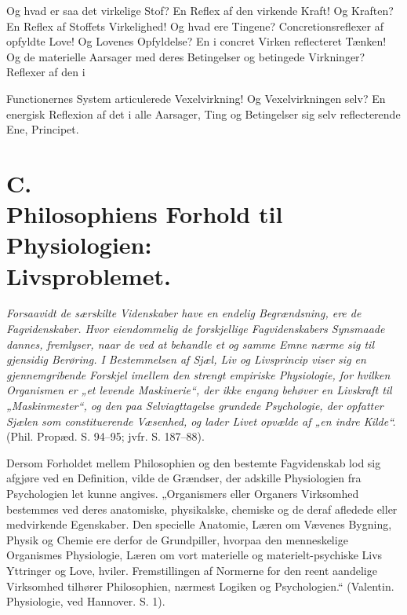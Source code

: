 \documentclass[12pt,a4paper]{book}
\begin{document}
Og hvad er saa det virkelige Stof? En Reflex af
den virkende Kraft! Og Kraften? En Reflex af Stoffets
Virkelighed! Og hvad ere Tingene? Concretionsreflexer af
opfyldte Love! Og Lovenes Opfyldelse? En i concret Virken
reflecteret Tænken! Og de materielle Aarsager med deres
Betingelser og betingede Virkninger? Reflexer af den i

Functionernes System articulerede Vexelvirkning! Og Vexelvirkningen
selv? En energisk Reflexion af det i alle Aarsager, Ting og
Betingelser sig selv reflecterende Ene, Principet.

\section*{C.\\ Philosophiens Forhold til Physiologien:\\
Livsproblemet.}

\emph{Forsaavidt de særskilte Videnskaber have en endelig Begrændsning, ere
de Fagvidenskaber. Hvor eiendommelig de forskjellige
Fagvidenskabers Synsmaade dannes, fremlyser, naar de ved at behandle
et og samme Emne nærme sig til gjensidig Berøring. I Bestemmelsen af
Sjæl, Liv og Livsprincip viser sig en gjennemgribende Forskjel
imellem den strengt empiriske Physiologie, for hvilken Organismen er
„et levende Maskinerie“, der ikke engang behøver en Livskraft til
„Maskinmester“, og den paa Selviagttagelse grundede Psychologie, der
opfatter Sjælen som constituerende Væsenhed, og lader Livet opvælde
af „en indre Kilde“.} (Phil. Propæd. S. 94--95; jvfr. S. 187--88).

Dersom Forholdet mellem Philosophien og den bestemte Fagvidenskab lod
sig afgjøre ved en Definition, vilde de Grændser, der adskille
Physiologien fra Psychologien let kunne angives. „Organismers eller
Organers Virksomhed bestemmes ved deres anatomiske, physikalske,
chemiske og de deraf afledede eller medvirkende Egenskaber. Den
specielle Anatomie, Læren om Vævenes Bygning, Physik og Chemie ere
derfor de Grundpiller, hvorpaa den menneskelige Organismes Physiologie,
Læren om vort materielle og materielt-psychiske Livs Yttringer og
Love, hviler. Fremstillingen af Normerne for den reent aandelige
Virksomhed tilhører Philosophien, nærmest Logiken og Psychologien.“
(Valentin. Physiologie, ved Hannover. S. 1).
\end{document}
